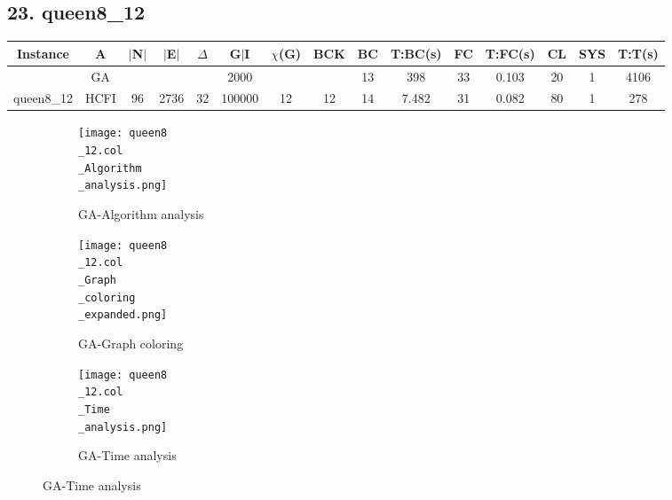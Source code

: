 \documentclass[10pt]{article}
\begin{document}
\subsection*{\hspace{0,9073976cm} 23. queen8\_12}
\begin{table}[H]
\centering
\begin{tabular}{|c|c|c|c|c|c|c|c|c|c|c|c|c|c|c|}
\hline
Instance& A &$|$N$|$ & $|$E$|$ & $\Delta$ & G$|$I & $\chi$(G) &BCK&BC & T:BC(s) & FC & T:FC(s) & CL & SYS & T:T(s) \\ \hline \hline

	&GA&       &                   &                     &    2000     &     \cellcolor{yellow} & {\cellcolor{yellow}}& {{\cellcolor{green}13}}
& 398   & 33       &0.103                   &20                    &1          &4106        \\ \cline{2-2} \cline{6-6} \cline{9-15}
 \multirow{-2}{*}{queen8\_12} &HCFI   &\multirow{-2}{*}{96}   &\multirow{-2}{*}{2736}     &\multirow{-2}{*}{32}     &100000     &\multirow{-2}{*}{\cellcolor{yellow}12}      & \multirow{-2}{*}{\cellcolor{yellow}12}    &{\cellcolor{green}14}     &7.482         &31     & 0.082         &80    &1     &278         \\ \hline 
\end{tabular}
\end{table}
\graphicspath{{./Core1/Solutions/GA/queen8\_12.col}}
\begin{figure}[H]
\begin{subfigure}{.33\textwidth}
  \centering
  \texttt{[image: queen8\\\_12.col\\\_Algorithm\\\_analysis.png]}
  \caption{GA-Algorithm analysis}
   \label{fig:subfig1}
\end{subfigure}%
\begin{subfigure}{.33\textwidth}
  \centering
  \texttt{[image: queen8\\\_12.col\\\_Graph\\\_coloring\\\_expanded.png]}
  \caption{GA-Graph coloring}
  \label{fig:subfig2}
\end{subfigure}
\begin{subfigure}{.33\textwidth}
  \centering
  \texttt{[image: queen8\\\_12.col\\\_Time\\\_analysis.png]}
  \caption{GA-Time analysis}
  \end{subfigure}
\end{figure}
\end{document}
